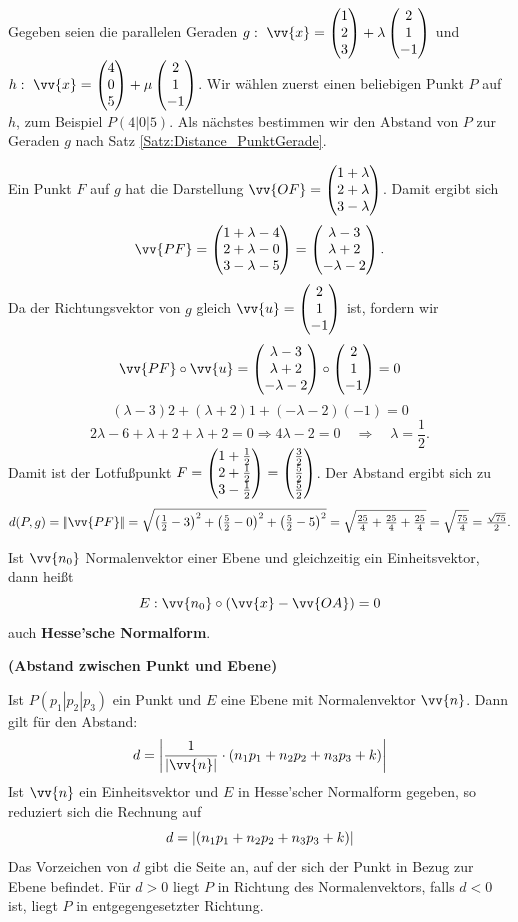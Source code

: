 \documentclass[ngerman, 12pt]{nssheetxea}
\begin{document}
\begin{example} Gegeben seien die parallelen Geraden $g:\ \vv{x}=\colvec[1]{2}{3}+\lambda\colvec[2]{1}{-1}$ und $h:\ \vv{x}=\colvec[4]{0}{5}+\mu\colvec[2]{1}{-1}$. Wir wählen zuerst einen beliebigen Punkt $P$ auf $h$, zum Beispiel $P(4|0|5)$. Als nächstes bestimmen wir den Abstand von $P$ zur Geraden $g$ nach Satz \ref{Satz:Distance_PunktGerade}.

Ein Punkt $F$ auf $g$ hat die Darstellung $\vv{OF}=\colvec[1+\lambda]{2+ \lambda}{3-\lambda}$.
Damit ergibt sich
\[
\vv{PF}=\colvec[1+\lambda - 4]{2+\lambda - 0}{3-\lambda - 5}
=\colvec[\lambda - 3]{\lambda + 2}{- \lambda - 2}.
\]
Da der Richtungsvektor von $g$ gleich $\vv{u}=\colvec[2]{1}{-1}$ ist, fordern wir
\[
\vv{PF}\circ \vv{u} = \colvec[\lambda - 3]{\lambda + 2}{-\lambda - 2}
\circ
\colvec[2]{1}{-1}
=0
\]
\[
(\lambda - 3)2 + (\lambda + 2)1 + (-\lambda - 2)(-1)=0
\]
\[
2\lambda - 6 + \lambda + 2 + \lambda + 2 = 0
\Rightarrow
4\lambda - 2 = 0
\quad\Rightarrow\quad
\lambda = \frac{1}{2}.
\]
Damit ist der Lotfußpunkt $F=\colvec[1+\tfrac12]{2+\tfrac12}{3-\tfrac12}
=\colvec[\tfrac32]{\tfrac52}{\tfrac52}$.
Der Abstand ergibt sich zu
\[
d(P,g)=|\!|\vv{PF}|\!|
= \sqrt{\left(\tfrac12 - 3\right)^2 + \left(\tfrac52 - 0\right)^2 + \left(\tfrac52 - 5\right)^2}
= \sqrt{\tfrac{25}{4} + \tfrac{25}{4} + \tfrac{25}{4}}
= \sqrt{\tfrac{75}{4}}
= \tfrac{\sqrt{75}}{2}.
\]
\end{example}

\begin{definition}
Ist $\vv{n_0}$ Normalenvektor einer Ebene und gleichzeitig ein Einheitsvektor, dann heißt
\[ E:\vv{n_0}\circ \mleft( \vv{x} - \vv{OA} \mright) = 0  \]
auch \textbf{Hesse'sche Normalform}.
\end{definition}

\begin{theorem} \textbf{(Abstand zwischen Punkt und Ebene)} \par
Ist $P(p_1|p_2|p_3)$ ein Punkt und $E$ eine Ebene mit Normalenvektor $\vv{n}$. Dann gilt für den Abstand:
\[ d=\mleft| \frac{1}{|\vv{n}|} \cdot (n_1p_1+n_2p_2+n_3p_3+k) \mright|  \]
Ist $\vv{n}$ ein Einheitsvektor und $E$ in Hesse'scher Normalform gegeben, so reduziert sich die Rechnung auf
\[ d=\mleft| (n_1p_1+n_2p_2+n_3p_3+k) \mright|  \]
Das Vorzeichen von $d$ gibt die Seite an, auf der sich der Punkt in Bezug zur Ebene befindet. Für $d>0$ liegt $P$ in Richtung des Normalenvektors, falls $d<0$ ist, liegt $P$ in entgegengesetzter Richtung.
\label{Satz:Distance_PunktEbene}
\end{theorem}
\end{document}
